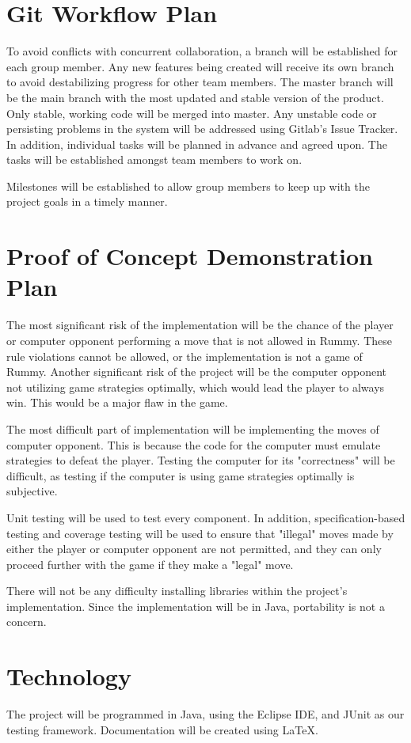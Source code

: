 \documentclass[12pt]{article}
\begin{document}
\section{Git Workflow Plan}
To avoid conflicts with concurrent collaboration, a branch will be established for each group member. Any new features being created will receive its own branch to avoid destabilizing progress for other team members. The master branch will be the main branch with the most updated and stable version of the product. Only stable, working code will be merged into master. Any unstable code or persisting problems in the system will be addressed using Gitlab's Issue Tracker. In addition, individual tasks will be planned in advance and agreed upon. The tasks will be established amongst team members to work on. 

Milestones will be established to allow group members to keep up with the project goals in a timely manner.

\section{Proof of Concept Demonstration Plan}
The most significant risk of the implementation will be the chance of the player or computer opponent performing a move that is not allowed in Rummy. These rule violations cannot be allowed, or the implementation is not a game of Rummy.
Another significant risk of the project will be the computer opponent not utilizing game strategies optimally, which would lead the player to always win. This would be a major flaw in the game.

The most difficult part of implementation will be implementing the moves of computer opponent. This is because the code for the computer must emulate strategies to defeat the player. Testing the computer for its "correctness" will be difficult, as testing if the computer is using game strategies optimally is subjective. 

Unit testing will be used to test every component. In addition, specification-based testing and coverage testing will be used to ensure that "illegal" moves made by either the player or computer opponent are not permitted, and they can only proceed further with the game if they make a "legal" move.

There will not be any difficulty installing libraries within the project's implementation. Since the implementation will be in Java, portability is not a concern.

\section{Technology}
The project will be programmed in Java, using the Eclipse IDE, and JUnit as our testing framework. Documentation will be created using LaTeX.
\end{document}
